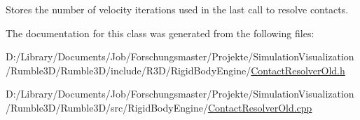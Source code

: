 Stores the number of velocity iterations used in the last call to resolve contacts. 

The documentation for this class was generated from the following files\+:\begin{DoxyCompactItemize}
\item 
D\+:/\+Library/\+Documents/\+Job/\+Forschungsmaster/\+Projekte/\+Simulation\+Visualization/\+Rumble3\+D/\+Rumble3\+D/include/\+R3\+D/\+Rigid\+Body\+Engine/\mbox{\hyperlink{_contact_resolver_old_8h}{Contact\+Resolver\+Old.\+h}}\item 
D\+:/\+Library/\+Documents/\+Job/\+Forschungsmaster/\+Projekte/\+Simulation\+Visualization/\+Rumble3\+D/\+Rumble3\+D/src/\+Rigid\+Body\+Engine/\mbox{\hyperlink{_contact_resolver_old_8cpp}{Contact\+Resolver\+Old.\+cpp}}\end{DoxyCompactItemize}
